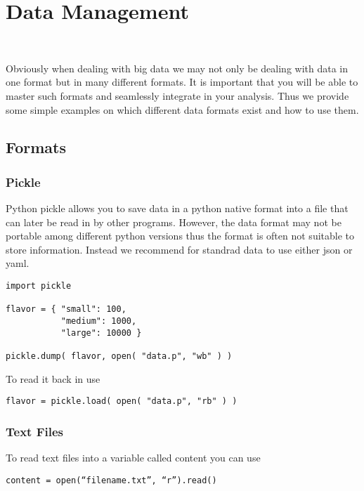 \chapter{Data Management}

\FILENAME\

Obviously when dealing with big data we may not only be dealing with
data in one format but in many different formats. It is important that
you will be able to master such formats and seamlessly integrate in
your analysis. Thus we provide some simple examples on which different
data formats exist and how to use them.

\section{Formats}

\subsection{Pickle}

Python pickle allows you to save data in a python native format into a file
that can later be read in by other programs. However, the data format
may not be portable among different python versions thus the format is
often not suitable to store information. Instead we recommend for
standrad data to use either json or yaml.

\begin{verbatim}
import pickle

flavor = { "small": 100, 
           "medium": 1000,
           "large": 10000 }

pickle.dump( flavor, open( "data.p", "wb" ) )

\end{verbatim}

To read it back in use

\begin{verbatim}
flavor = pickle.load( open( "data.p", "rb" ) )
\end{verbatim}

\subsection{Text Files}

To read text files into a variable called content  you can use 

\begin{verbatim}
content = open(“filename.txt”, “r”).read() 
\end{verbatim}

